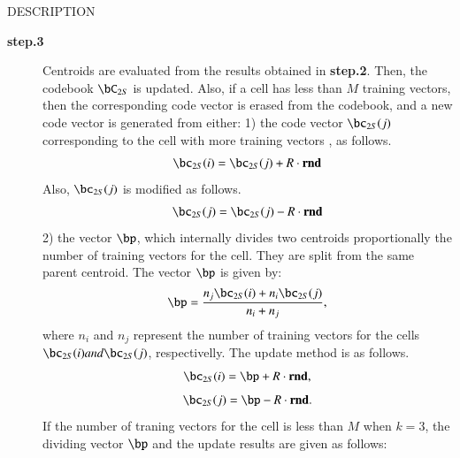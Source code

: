 \begin{qsection}{DESCRIPTION}
\begin{description}
\item[\bf step.3~~~]
Centroids are evaluated from the results obtained in {\bf step.2}.
Then, the codebook $\bC_{2S}$ is updated.
Also, if a cell has less than $M$ training vectors, then the corresponding
code vector is erased from the codebook,
and a new code vector is generated from either: 1) the code vector $\bc_{2S}(j)$  corresponding to the cell with more training vectors
, as follows.
\begin{displaymath}
\bc_{2S}(i) = \bc_{2S}(j) + R \cdot \bm{\mathrm{rnd}}
\end{displaymath}
Also, $\bc_{2S}(j)$ is modified as follows.
\begin{displaymath}
\bc_{2S}(j) = \bc_{2S}(j) - R \cdot \bm{\mathrm{rnd}}
\end{displaymath}
 2) the vector $\bp$, which internally divides
two centroids proportionally the number of training vectors for the cell.
They are split from the same parent centroid.
The vector $\bp$ is given by: 
\begin{displaymath}
\bp= \frac{n_{j}\bc_{2S}(i) + n_{i}\bc_{2S}(j)}{n_{i}+n_{j}},
\end{displaymath}
where $n_{i}$ and $n_{j}$ represent the number of training vectors for
the cells $\bc_{2S}(i) and \bc_{2S}(j)$, respectivelly.
The update method is as follows.
\begin{displaymath}
\bc_{2S}(i) = \bp + R \cdot \bm{\mathrm{rnd}},
\end{displaymath}
\begin{displaymath}
\bc_{2S}(j) = \bp- R \cdot \bm{\mathrm{rnd}}.
\end{displaymath}
If the number of traning vectors for the cell is less than $M$ when $k =
3$, the dividing vector $\bp$ and the update results are given as follows:


\end{description}
\end{qsection}
